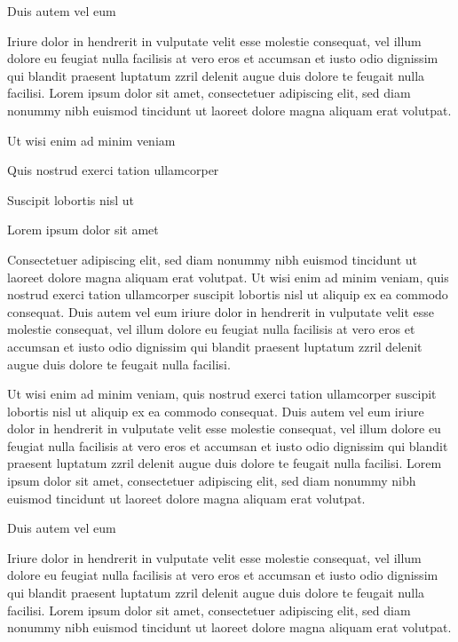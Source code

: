 \documentclass[11pt,twoside]{article}\makeatletter
\begin{document}
Duis autem vel eum \par
Iriure dolor in hendrerit in vulputate velit esse molestie       consequat, vel illum dolore eu feugiat nulla facilisis at vero eros et       accumsan et iusto odio dignissim qui blandit praesent luptatum zzril       delenit augue duis dolore te feugait nulla facilisi. Lorem ipsum dolor       sit amet, consectetuer adipiscing elit, sed diam nonummy nibh euismod       tincidunt ut laoreet dolore magna aliquam erat volutpat. \par
Ut wisi enim ad minim veniam\par
Quis nostrud exerci tation ullamcorper \par
Suscipit lobortis nisl ut \par
Lorem ipsum dolor sit amet\par
Consectetuer adipiscing elit, sed diam nonummy nibh euismod       tincidunt ut laoreet dolore magna aliquam erat volutpat. Ut wisi enim       ad minim veniam, quis nostrud exerci tation ullamcorper suscipit       lobortis nisl ut aliquip ex ea commodo consequat. Duis autem vel eum       iriure dolor in hendrerit in vulputate velit esse molestie consequat,       vel illum dolore eu feugiat nulla facilisis at vero eros et accumsan       et iusto odio dignissim qui blandit praesent luptatum zzril delenit       augue duis dolore te feugait nulla facilisi.\par
Ut wisi enim ad minim veniam, quis nostrud exerci tation       ullamcorper suscipit lobortis nisl ut aliquip ex ea commodo       consequat. Duis autem vel eum iriure dolor in hendrerit in vulputate       velit esse molestie consequat, vel illum dolore eu feugiat nulla       facilisis at vero eros et accumsan et iusto odio dignissim qui blandit       praesent luptatum zzril delenit augue duis dolore te feugait nulla       facilisi. Lorem ipsum dolor sit amet, consectetuer adipiscing elit,       sed diam nonummy nibh euismod tincidunt ut laoreet dolore magna       aliquam erat volutpat. \par
Duis autem vel eum \par
Iriure dolor in hendrerit in vulputate velit esse molestie       consequat, vel illum dolore eu feugiat nulla facilisis at vero eros et       accumsan et iusto odio dignissim qui blandit praesent luptatum zzril       delenit augue duis dolore te feugait nulla facilisi. Lorem ipsum dolor       sit amet, consectetuer adipiscing elit, sed diam nonummy nibh euismod       tincidunt ut laoreet dolore magna aliquam erat volutpat. \par
\end{document}
